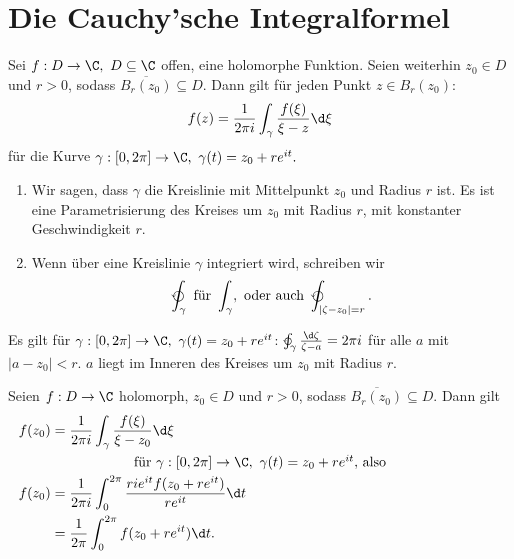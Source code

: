 \section{Die Cauchy'sche Integralformel}\lecture
		
		\begin{thm}
			Sei $ f: D \to \C,\ D \subseteq \C $ offen, eine holomorphe Funktion. Seien weiterhin $ z_0 \in D $ und $ r > 0 $, sodass $ \overbar{B_r(z_0)} \subseteq D. $ Dann gilt für jeden Punkt $ z \in B_r(z_0) $:
			\[ f(z) = \frac{1}{2\pi i} \int_\gamma \frac{f(\xi)}{\xi - z} \d \xi \]
			für die Kurve $ \gamma: [0,2\pi] \to \C,\ \gamma(t) = z_0 + re^{it}. $
		\end{thm}
		
		\begin{rem}
			\begin{enumerate}[label = {\alph*})]
				\item Wir sagen, dass $\gamma$ die Kreislinie mit Mittelpunkt $z_0$ und Radius $r$ ist. Es ist eine Parametrisierung des Kreises um $z_0$ mit Radius $r$, mit konstanter Geschwindigkeit $r$.
				\item Wenn über eine Kreislinie $\gamma$ integriert wird, schreiben wir 
				$$ \varointctrclockwise_\gamma\ \text{für } \int_\gamma,\ \text{oder auch } \varointctrclockwise_{|\zeta - z_0|=r}. $$
			\end{enumerate}
		\end{rem}
		
		\begin{lem}
			Es gilt für $ \gamma: [0,2\pi] \to \C,\ \gamma(t) = z_0 + re^{it} $: $ \varointctrclockwise_\gamma \frac{\d \zeta}{\zeta - a} = 2\pi i $ für alle $a$ mit $ |a-z_0| < r. $ $a$ liegt im Inneren des Kreises um $z_0$ mit Radius $r$.
		\end{lem}
		
		\begin{corn}["Mittelwertgleichung"]
			Seien $ f: D \to \C $ holomorph, $ z_0 \in D $ und $ r > 0 $, sodass $ \overbar{B_r(z_0)} \subseteq D $. Dann gilt
			\begin{align*}
				f(z_0) &= \frac{1}{2\pi i} \int_\gamma \frac{f(\xi)}{\xi - z_0} \d \xi\\
				\noalign{\centering für $ \gamma: [0,2\pi] \to \C,\ \gamma(t) = z_0 + re^{it} $, also}
				f(z_0) &= \frac{1}{2\pi i} \int_0^{2\pi} \frac{rie^{it} f(z_0+re^{it})}{re^{it}} \d t\\
				&= \frac{1}{2\pi} \int_0^{2\pi} f(z_0+re^{it}) \d t.
			\end{align*}
		\end{corn}
		
